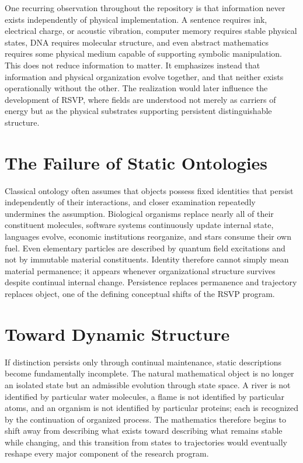 \documentclass[11pt,oneside]{book}
\numberwithin{equation}{chapter}
\theoremstyle{definition}
\theoremstyle{plain}
\begin{document}
One recurring observation throughout the repository is that information never exists independently of physical implementation. A sentence requires ink, electrical charge, or acoustic vibration, computer memory requires stable physical states, DNA requires molecular structure, and even abstract mathematics requires some physical medium capable of supporting symbolic manipulation. This does not reduce information to matter. It emphasizes instead that information and physical organization evolve together, and that neither exists operationally without the other. The realization would later influence the development of RSVP, where fields are understood not merely as carriers of energy but as the physical substrates supporting persistent distinguishable structure.

\section{The Failure of Static Ontologies}

Classical ontology often assumes that objects possess fixed identities that persist independently of their interactions, and closer examination repeatedly undermines the assumption. Biological organisms replace nearly all of their constituent molecules, software systems continuously update internal state, languages evolve, economic institutions reorganize, and stars consume their own fuel. Even elementary particles are described by quantum field excitations and not by immutable material constituents. Identity therefore cannot simply mean material permanence; it appears whenever organizational structure survives despite continual internal change. Persistence replaces permanence and trajectory replaces object, one of the defining conceptual shifts of the RSVP program.

\section{Toward Dynamic Structure}

If distinction persists only through continual maintenance, static descriptions become fundamentally incomplete. The natural mathematical object is no longer an isolated state but an admissible evolution through state space. A river is not identified by particular water molecules, a flame is not identified by particular atoms, and an organism is not identified by particular proteins; each is recognized by the continuation of organized process. The mathematics therefore begins to shift away from describing what exists toward describing what remains stable while changing, and this transition from states to trajectories would eventually reshape every major component of the research program.
\end{document}
